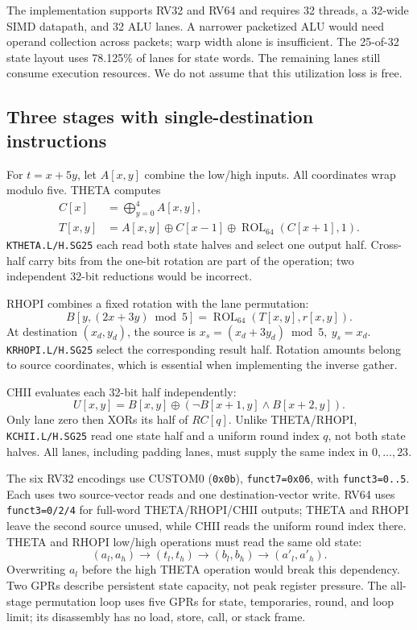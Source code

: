 \documentclass[conference,letterpaper]{IEEEtran}
\newcommand{\code}[1]{\texttt{#1}}
\newcommand{\rot}{\operatorname{ROL}_{64}}
\begin{document}
The implementation supports RV32 and RV64 and requires 32 threads, a 32-wide
SIMD datapath, and 32 ALU lanes. A narrower packetized ALU would need operand
collection across packets; warp width alone is insufficient.
The 25-of-32 state layout uses 78.125\% of lanes for state words. The
remaining lanes still consume execution resources. We do not assume that
this utilization loss is free.

\subsection{Three stages with single-destination instructions}
For $t=x+5y$, let $A[x,y]$ combine the low/high inputs.
All coordinates wrap modulo five. THETA computes
\begin{align}
C[x]&=\bigoplus_{y=0}^{4} A[x,y],\\
T[x,y]&=A[x,y]\oplus C[x-1]\oplus\rot(C[x+1],1).
\end{align}
\code{KTHETA.L/H.SG25} each read both state halves and select one output
half. Cross-half carry bits from the one-bit rotation are part of the
operation; two independent 32-bit reductions would be incorrect.

RHOPI combines a fixed rotation with the lane permutation:
\begin{equation}
B[y,(2x+3y)\bmod5]=\rot(T[x,y],r[x,y]).
\end{equation}
At destination $(x_d,y_d)$, the source is
$x_s=(x_d+3y_d)\bmod5,\ y_s=x_d$.
\code{KRHOPI.L/H.SG25} select the corresponding result half. Rotation
amounts belong to source coordinates, which is essential when implementing
the inverse gather.

CHII evaluates each 32-bit half independently:
\begin{equation}
U[x,y]=B[x,y]\oplus(\neg B[x+1,y]\land B[x+2,y]).
\end{equation}
Only lane zero then XORs its half of $RC[q]$. Unlike THETA/RHOPI,
\code{KCHII.L/H.SG25} read one state half and a uniform round index $q$,
not both state halves. All lanes, including padding lanes, must supply the
same index in $0,\ldots,23$.

The six RV32 encodings use CUSTOM0 (\code{0x0b}), \code{funct7=0x06},
with \code{funct3=0..5}. Each uses two source-vector reads and one
destination-vector write. RV64 uses \code{funct3=0/2/4} for full-word
THETA/RHOPI/CHII outputs; THETA and RHOPI leave the second source unused,
while CHII reads the uniform round index there.
THETA and RHOPI low/high operations must read the same old state:
\begin{equation}
(a_l,a_h)\rightarrow(t_l,t_h)\rightarrow(b_l,b_h)
\rightarrow(a'_l,a'_h).
\end{equation}
Overwriting $a_l$ before the high THETA operation would break this
dependency. Two GPRs describe persistent state capacity, not peak register
pressure. The all-stage permutation loop uses five GPRs for state,
temporaries, round, and loop limit; its disassembly has no load, store,
call, or stack frame.
\end{document}
